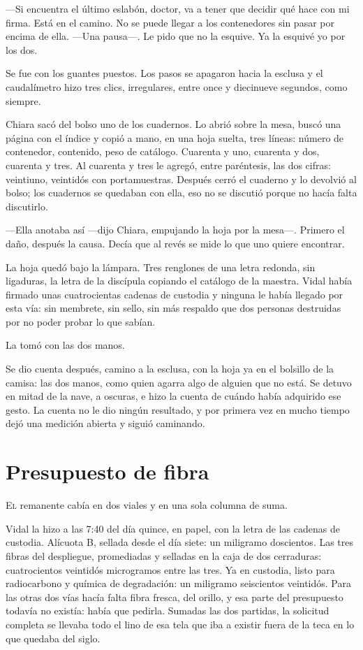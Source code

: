 ---Si encuentra el último eslabón, doctor, va a tener que decidir qué hace con mi firma. Está en el camino. No se puede llegar a los contenedores sin pasar por encima de ella. ---Una pausa---. Le pido que no la esquive. Ya la esquivé yo por los dos.

Se fue con los guantes puestos. Los pasos se apagaron hacia la esclusa y el caudalímetro hizo tres clics, irregulares, entre once y diecinueve segundos, como siempre.

Chiara sacó del bolso uno de los cuadernos. Lo abrió sobre la mesa, buscó una página con el índice y copió a mano, en una hoja suelta, tres líneas: número de contenedor, contenido, peso de catálogo. Cuarenta y uno, cuarenta y dos, cuarenta y tres. Al cuarenta y tres le agregó, entre paréntesis, las dos cifras: veintiuno, veintidós con portamuestras. Después cerró el cuaderno y lo devolvió al bolso; los cuadernos se quedaban con ella, eso no se discutió porque no hacía falta discutirlo.

---Ella anotaba así ---dijo Chiara, empujando la hoja por la mesa---. Primero el daño, después la causa. Decía que al revés se mide lo que uno quiere encontrar.

La hoja quedó bajo la lámpara. Tres renglones de una letra redonda, sin ligaduras, la letra de la discípula copiando el catálogo de la maestra. Vidal había firmado unas cuatrocientas cadenas de custodia y ninguna le había llegado por esta vía: sin membrete, sin sello, sin más respaldo que dos personas destruidas por no poder probar lo que sabían.

La tomó con las dos manos.

Se dio cuenta después, camino a la esclusa, con la hoja ya en el bolsillo de la camisa: las dos manos, como quien agarra algo de alguien que no está. Se detuvo en mitad de la nave, a oscuras, e hizo la cuenta de cuándo había adquirido ese gesto. La cuenta no le dio ningún resultado, y por primera vez en mucho tiempo dejó una medición abierta y siguió caminando.

\clearpage

\chapter{Presupuesto de fibra}

\lettrine[lines=2, lhang=0.1, nindent=0.2em]{E}{l} remanente cabía en dos viales y en una sola columna de suma.


Vidal la hizo a las 7:40 del día quince, en papel, con la letra de las cadenas de custodia. Alícuota B, sellada desde el día siete: un miligramo doscientos. Las tres fibras del despliegue, promediadas y selladas en la caja de dos cerraduras: cuatrocientos veintidós microgramos entre las tres. Ya en custodia, listo para radiocarbono y química de degradación: un miligramo seiscientos veintidós. Para las otras dos vías hacía falta fibra fresca, del orillo, y esa parte del presupuesto todavía no existía: había que pedirla. Sumadas las dos partidas, la solicitud completa se llevaba todo el lino de esa tela que iba a existir fuera de la teca en lo que quedaba del siglo.

